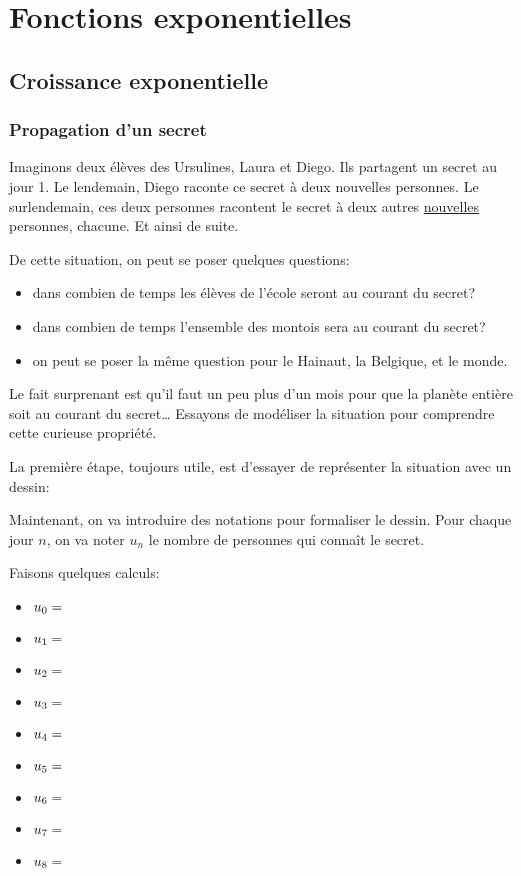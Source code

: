 \documentclass[a4paper,12pt,singlepage]{report}
\begin{document}
\chapter{Fonctions exponentielles}
\label{sec:orgeb3fa81}
\section{Croissance exponentielle}
\label{sec:org8bf92f9}
\subsection{Propagation d'un secret}
\label{sec:orge85e96c}
Imaginons deux élèves des Ursulines, Laura et Diego. Ils partagent un secret au
jour 1. Le lendemain, Diego raconte ce secret à deux nouvelles personnes. Le
surlendemain, ces deux personnes racontent le secret à deux autres \uline{nouvelles}
personnes, chacune. Et ainsi de suite.

De cette situation, on peut se poser quelques questions:
\begin{itemize}
\item dans combien de temps les élèves de l'école seront au courant du secret?
\item dans combien de temps l'ensemble des montois sera au courant du secret?
\item on peut se poser la même question pour le Hainaut, la Belgique, et le monde.
\end{itemize}

Le fait surprenant est qu'il faut un peu plus d'un mois pour que la planète
entière soit au courant du secret\ldots{} Essayons de modéliser la situation pour
comprendre cette curieuse propriété.

La première étape, toujours utile, est d'essayer de représenter la situation
avec un dessin:

\vspace{10cm}

Maintenant, on va introduire des notations pour formaliser le dessin. Pour
chaque jour \(n\), on va noter \(u_n\) le nombre de personnes qui connaît le
secret.

Faisons quelques calculs:
\par \setlength{\columnseprule}{0 pt}
          \begin{minipage}[t]{\linewidth}
          \begin{multicols}{3}
\begin{itemize}
\item \(u_0=\dotfill\)
\item \(u_{1}=\dotfill\)
\item \(u_{2}=\dotfill\)
\item \(u_{3}=\dotfill\)
\item \(u_{4}=\dotfill\)
\item \(u_{5}=\dotfill\)
\item \(u_{6}=\dotfill\)
\item \(u_{7}=\dotfill\)
\item \(u_{8}=\dotfill\)
\end{itemize}


\end{multicols}\end{minipage}
\end{document}
